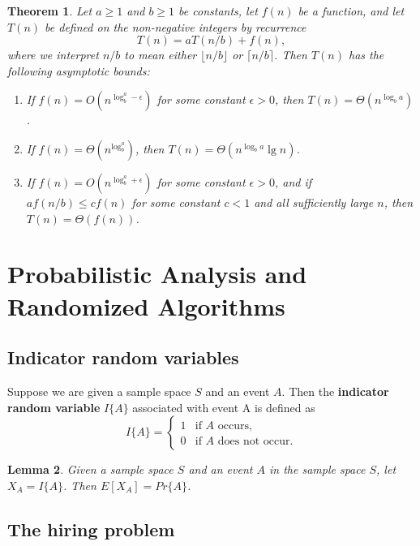 \documentclass[12pt]{article}
\newtheorem{theorem}{Theorem}
\newtheorem{lemma}[theorem]{Lemma}
\begin{document}
\begin{theorem}
  Let $a \ge 1$ and $b \ge 1$ be constants, let $f(n)$ be a function, and let $T(n)$ be defined on the non-negative integers by recurrence
  \begin{equation*}
    T(n) = aT(n/b) + f(n),
  \end{equation*}
  where we interpret $n/b$ to mean either $\lfloor n/b \rfloor$ or $\lceil n/b \rceil$. Then $T(n)$ has the following asymptotic bounds:
  \begin{enumerate}
  \item If $f(n) = O(n^{\log_b^a - \epsilon})$ for some constant $\epsilon > 0$, then $T(n) = \Theta (n^{\log_b a})$.
  \item If $f(n) = \Theta (n^{\log_b^a})$, then $T(n) = \Theta (n^{\log_b a} \lg n)$.
  \item If $f(n) = O(n^{\log_b^a + \epsilon})$ for some constant $\epsilon > 0$, and if $af(n/b) \le cf(n)$ for some constant $c < 1$ and all sufficiently large $n$, then $T(n) = \Theta \left( f(n) \right)$.
  \end{enumerate}
\end{theorem}

\section{Probabilistic Analysis and Randomized Algorithms}

\subsection{Indicator random variables}

Suppose we are given a sample space $S$ and an event $A$. Then the \textbf {indicator random variable} $I\{A\}$ associated with event A is defined as
\begin{equation*}
  I\{A\} =
  \begin{cases}
    1 & \text{if $A$ occurs,} \\
    0 & \text{if $A$ does not occur.}
  \end{cases}
\end{equation*}

\begin{lemma}
  Given a sample space $S$ and an event $A$ in the sample space $S$, let $X_A = I\{ A \}$. Then $E[X_A] = Pr \{ A \}$.
\end{lemma}

\subsection{The hiring problem}
\end{document}
